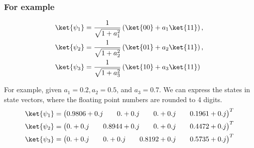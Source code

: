 \documentclass{beamer}
\begin{document}
\begin{frame}
    \frametitle{For example}
    \label{frame:nonortho_ex}
    {\tiny
        \begin{align*}
            \ket{\psi_1} & = \frac{1}{\sqrt{1 + a_{1}^{2}}} \left( \ket{00} + a_{1} \ket{11} \right) , \\
            \ket{\psi_2} & = \frac{1}{\sqrt{1 + a_{2}^{2}}} \left( \ket{01} + a_{2} \ket{11} \right) , \\
            \ket{\psi_3} & = \frac{1}{\sqrt{1 + a_{3}^{2}}} \left( \ket{10} + a_{3} \ket{11} \right)
        \end{align*}
    }

    For example, given $a_{1} = 0.2, a_{2} = 0.5$, and $a_{3} = 0.7$.
    We can express the states in state vectors, where the floating point numbers are rounded to 4 digits.
        {\small
            \begin{align*}
                \ket{\psi_1} & = \begin{pmatrix}
                                     0.9806+0.j &  & 0.    +0.j &  & 0.    +0.j &  & 0.1961+0.j
                                 \end{pmatrix}^{T} \\
                \ket{\psi_2} & = \begin{pmatrix}
                                     0.    +0.j &  & 0.8944+0.j &  & 0.    +0.j &  & 0.4472+0.j
                                 \end{pmatrix}^{T} \\
                \ket{\psi_3} & = \begin{pmatrix}
                                     0.    +0.j &  & 0.    +0.j &  & 0.8192+0.j &  & 0.5735+0.j
                                 \end{pmatrix}^{T}
            \end{align*}
        }
\end{frame}
\end{document}
